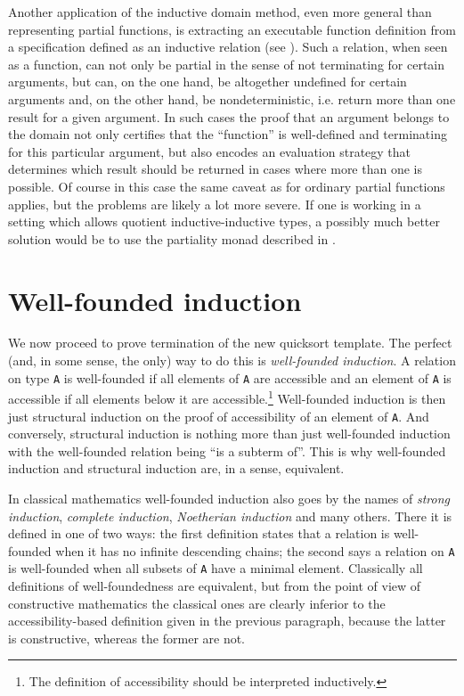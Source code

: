 \documentclass[declaration,mgr,english,shortabstract]{iithesis}
\newcommand{\m}[1]{\texttt{#1}}
\begin{document}
Another application of the inductive domain method, even more general than representing partial functions, is extracting an executable function definition from a specification defined as an inductive relation (see \cite{Function}). Such a relation, when seen as a function, can not only be partial in the sense of not terminating for certain arguments, but can, on the one hand, be altogether undefined for certain arguments and, on the other hand, be nondeterministic, i.e. return more than one result for a given argument. In such cases the proof that an argument belongs to the domain not only certifies that the ``function'' is well-defined and terminating for this particular argument, but also encodes an evaluation strategy that determines which result should be returned in cases where more than one is possible. Of course in this case the same caveat as for ordinary partial functions applies, but the problems are likely a lot more severe. If one is working in a setting which allows quotient inductive-inductive types, a possibly much better solution would be to use the partiality monad described in \cite{PartialityMonad}.

\section{Well-founded induction} \label{wellfounded}

We now proceed to prove termination of the new quicksort template. The perfect (and, in some sense, the only) way to do this is \textit{well-founded induction}. A relation on type \m{A} is well-founded if all elements of \m{A} are accessible and an element of \m{A} is accessible if all elements below it are accessible.\footnote{The definition of accessibility should be interpreted inductively.} Well-founded induction is then just structural induction on the proof of accessibility of an element of \m{A}. And conversely, structural induction is nothing more than just well-founded induction with the well-founded relation being ``is a subterm of''. This is why well-founded induction and structural induction are, in a sense, equivalent.

In classical mathematics well-founded induction also goes by the names of \textit{strong induction}, \textit{complete induction}, \textit{Noetherian induction} and many others. There it is defined in one of two ways: the first definition states that a relation is well-founded when it has no infinite descending chains; the second says a relation on \m{A} is well-founded when all subsets of \m{A} have a minimal element. Classically all definitions of well-foundedness are equivalent, but from the point of view of constructive mathematics the classical ones are clearly inferior to the accessibility-based definition given in the previous paragraph, because the latter is constructive, whereas the former are not.
\end{document}
